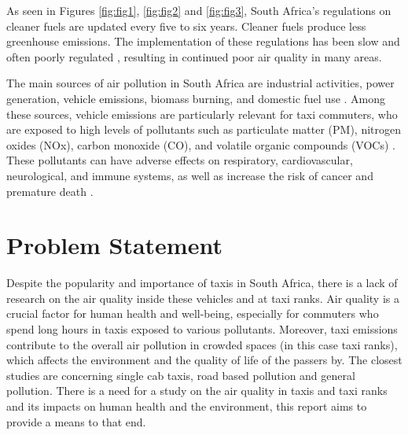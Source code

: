\noindent
As seen in Figures \ref{fig:fig1}, \ref{fig:fig2} and \ref{fig:fig3}, South Africa's regulations on cleaner fuels are updated every five to six years. Cleaner fuels produce less greenhouse emissions. The implementation of these regulations has been slow and often poorly regulated \cite{newcleanfuelstandards}, resulting in continued poor air quality in many areas.

\noindent
The main sources of air pollution in South Africa are industrial activities, power generation, vehicle emissions, biomass burning, and domestic fuel use \cite{Bylaws2023}. Among these sources, vehicle emissions are particularly relevant for taxi commuters, who are exposed to high levels of pollutants such as particulate matter (PM), nitrogen oxides (NOx), carbon monoxide (CO), and volatile organic compounds (VOCs) \cite{Venter2018}. These pollutants can have adverse effects on respiratory, cardiovascular, neurological, and immune systems, as well as increase the risk of cancer and premature death \cite{WHO2016}.


\section{Problem Statement}
Despite the popularity and importance of taxis in South Africa, there is a lack of research on the air quality inside these vehicles and at taxi ranks. 
Air quality is a crucial factor for human health and well-being, especially for commuters who spend long hours in taxis exposed to various pollutants.
Moreover, taxi emissions contribute to the overall air pollution in crowded spaces (in this case taxi ranks), which affects the environment and the quality of life of the passers by. The closest studies are concerning single cab taxis\cite{insidetaxismall}, road based pollution\cite{taxiNetwork} and general pollution\cite{Environmentalimpact}.
There is a need for a study on the air quality in taxis and taxi ranks and its impacts on human health and the environment, this report aims to provide a means to that end.

